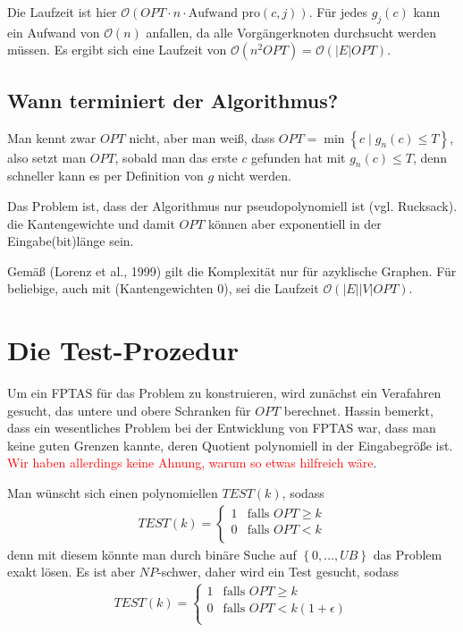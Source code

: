 \documentclass{article}
\begin{document}
Die Laufzeit ist hier $\mathcal{O}(OPT\cdot n \cdot \text{Aufwand pro
$(c,j)$})$. Für jedes $g_j(c)$ kann ein Aufwand von $\mathcal{O}\left(n\right)$ anfallen,
da alle Vorgängerknoten durchsucht werden müssen. Es ergibt sich eine Laufzeit
von $\mathcal{O}\left(n^2 OPT\right) = \mathcal{O}\left(|E| OPT\right)$.

\subsection{Wann terminiert der Algorithmus?}

Man kennt zwar $OPT$ nicht, aber man weiß, dass $OPT=\min\left\{c \mid g_n(c)
\le T\right\}$, also setzt man $OPT$, sobald man das erste $c$ gefunden hat mit 
$g_n(c)\le T$, denn schneller kann es per Definition von $g$ nicht werden.

Das Problem ist, dass der Algorithmus nur pseudopolynomiell ist (vgl. Rucksack).
die Kantengewichte und damit $OPT$ können aber exponentiell in der Eingabe(bit)länge sein.

Gemäß (Lorenz et al., 1999) gilt die Komplexität nur für azyklische Graphen. Für
beliebige, auch mit (Kantengewichten $0$), sei die Laufzeit
$\mathcal{O}\left(|E||V|OPT\right)$.

\section{Die Test-Prozedur}

Um ein FPTAS für das Problem zu konstruieren, wird zunächst ein Verafahren
gesucht, das untere und obere Schranken für $OPT$ berechnet. Hassin bemerkt,
dass ein wesentliches Problem bei der Entwicklung von FPTAS war, dass man keine
guten Grenzen kannte, deren Quotient polynomiell in der Eingabegröße ist.
\textcolor{red}{Wir haben allerdings keine Ahnung, warum so etwas hilfreich wäre}.

Man wünscht sich einen polynomiellen $TEST(k)$, sodass 
\begin{align*}
   TEST(k) = 
   \begin{cases}
      1 & \text{falls } OPT \ge k \\
      0 & \text{falls } OPT < k \\
   \end{cases} 
\end{align*}
denn mit diesem könnte man durch binäre Suche auf $\left\{0,\ldots,UB\right\}$ das
Problem exakt lösen. Es ist aber $NP$-schwer, daher wird ein Test gesucht,
sodass
\begin{align*}
   TEST(k) = 
   \begin{cases}
      1 & \text{falls } OPT \ge k \\
      0 & \text{falls } OPT < k(1 + \epsilon) \\
   \end{cases} 
\end{align*}
\end{document}
